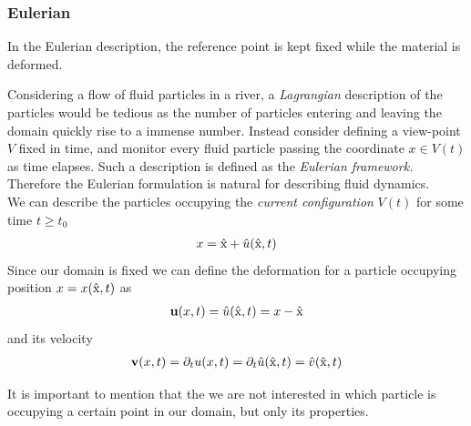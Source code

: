 \subsubsection*{Eulerian}
 In the Eulerian description, the reference point is kept fixed while the material is deformed.





Considering a flow of fluid particles in a river, a \textit{Lagrangian} description of the particles would be tedious as the number of particles entering and leaving the domain quickly rise to a immense number. 
Instead consider defining a view-point $V$ fixed in time, and monitor every fluid particle passing the coordinate $x \in V(t)$ as time elapses. Such a description is defined as the \textit{Eulerian framework.} 
Therefore the Eulerian formulation is natural for describing fluid dynamics. \\
We can describe the particles occupying the \textit{current configuration} $V(t)$ for some time $t \geq t_0$ 
\begin{align*}
x = \text{\^{x}} + \hat{u}(\text{\^{x}}, t)	
\end{align*}
Since our domain is fixed we can define the deformation for a particle 
occupying position $x = x(\text{\^{x}},t)$ as
\begin{align*}
\textbf{u}(x, t) = \hat{u}(\text{\^{x}}, t) = x - \text{\^{x}}	\\
\end{align*}
and its velocity
\begin{align*}
\textbf{v}(x,t) = \partial_t u(x,t) = \partial_t \hat{u}(\text{\^{x}},t) = \hat{v}(\text{\^{x}},t)
\end{align*}

It is important to mention that the we are not interested in which particle is occupying a certain point in our domain, but only its properties. 

